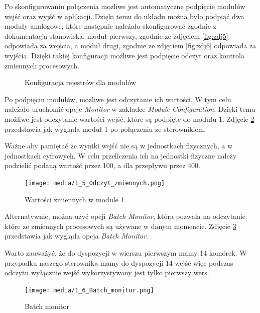 \documentclass{article}
\begin{document}
\newpage
Po skonfigurowaniu połączenia możliwe jest automatyczne podpięcie modułów wejść oraz wyjść w aplikacji. Dzięki temu do układu można było podpiąć dwa moduły analogowe, które następnie należało skonfigurować zgodnie z dokumentacją stanowiska, moduł pierwszy, zgodnie ze zdjęciem \ref{fig:zdj5} odpowiada za wejścia, a moduł drugi, zgodnie ze zdjęciem \ref{fig:zdj6} odpowiada za wyjścia. Dzięki takiej konfiguracji możliwe jest podpięcie odczyt oraz kontrola zmiennych procesowych. 

\begin{figure}[H]
    \centering
    \caption{Konfiguracja rejestrów dla modułów}
    \label{fig:main1}
\end{figure}

Po podpięciu modułów, możliwe jest odczytanie ich wartości. W tym celu należało uruchomić opcje \textit{Monitor}  w zakładce \textit{Module Configuration}. Dzięki temu możliwe jest odczytanie wartości wejść, które są podpięte do modułu 1. Zdjęcie \ref{fig:zdj7} przedstawia jak wygląda moduł 1 po połączeniu ze sterownikiem.

Ważne aby pamiętać że wyniki wejść nie są w jednostkach fizycznych, a w jednostkach cyfrowych. W celu przeliczenia ich na jednostki fizyczne należy podzielić podaną wartość przez 100, a dla przepływu przez 400.


\begin{figure}[H]
    \centering
    \texttt{[image: media/1\_5\_Odczyt\_zmiennych.png]}
    \caption{Wartości zmiennych w module 1}
    \label{fig:zdj7}
\end{figure}

\newpage
Alternatywnie, można użyć opcji \textit{Batch Monitor}, która pozwala na odczytanie które ze zmiennych procesowych są używane w danym momencie. Zdjęcie \ref{fig:zdj8} przedstawia jak wygląda opcja \textit{Batch Monitor}. 

Warto zauważyć, że do dyspozycji w wierszu pierwszym mamy 14 komórek. W przypadku naszego sterownika mamy do dyspozycji 14 wejść więc podczas odczytu wyłącznie wejść wykorzystywany jest tylko pierwszy wers.
\begin{figure}[H]
    \centering
    \texttt{[image: media/1\_6\_Batch\_monitor.png]}
    \caption{Batch monitor}
    \label{fig:zdj8}
\end{figure}
\end{document}
